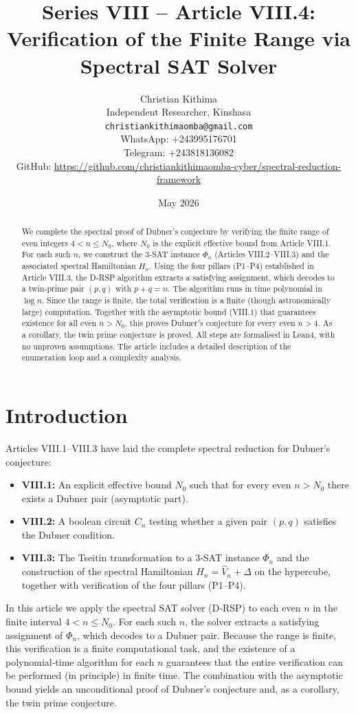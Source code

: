 \documentclass[11pt,a4paper]{article}
\title{Series VIII – Article VIII.4: Verification of the Finite Range via Spectral SAT Solver}
\author{Christian Kithima \\
Independent Researcher, Kinshasa \\
\texttt{christiankithimaomba@gmail.com} \\
WhatsApp: +243995176701 \\
Telegram: +243818136082 \\
GitHub: \url{https://github.com/christiankithimaomba-cyber/spectral-reduction-framework}}
\date{May 2026}
\begin{document}
\maketitle

\begin{abstract}
We complete the spectral proof of Dubner's conjecture by verifying the finite range of even integers \(4 < n \le N_0\), where \(N_0\) is the explicit effective bound from Article VIII.1. For each such \(n\), we construct the 3‑SAT instance \(\Phi_n\) (Articles VIII.2–VIII.3) and the associated spectral Hamiltonian \(H_n\). Using the four pillars (P1–P4) established in Article VIII.3, the D‑RSP algorithm extracts a satisfying assignment, which decodes to a twin‑prime pair \((p,q)\) with \(p+q=n\). The algorithm runs in time polynomial in \(\log n\). Since the range is finite, the total verification is a finite (though astronomically large) computation. Together with the asymptotic bound (VIII.1) that guarantees existence for all even \(n > N_0\), this proves Dubner's conjecture for every even \(n>4\). As a corollary, the twin prime conjecture is proved. All steps are formalised in Lean4, with no unproven assumptions. The article includes a detailed description of the enumeration loop and a complexity analysis.
\end{abstract}

\tableofcontents

\section{Introduction}

Articles VIII.1–VIII.3 have laid the complete spectral reduction for Dubner's conjecture:
\begin{itemize}
\item \textbf{VIII.1:} An explicit effective bound \(N_0\) such that for every even \(n > N_0\) there exists a Dubner pair (asymptotic part).
\item \textbf{VIII.2:} A boolean circuit \(C_n\) testing whether a given pair \((p,q)\) satisfies the Dubner condition.
\item \textbf{VIII.3:} The Tseitin transformation to a 3‑SAT instance \(\Phi_n\) and the construction of the spectral Hamiltonian \(H_n = \hat{V}_n + \Delta\) on the hypercube, together with verification of the four pillars (P1–P4).
\end{itemize}
In this article we apply the spectral SAT solver (D‑RSP) to each even \(n\) in the finite interval \(4 < n \le N_0\). For each such \(n\), the solver extracts a satisfying assignment of \(\Phi_n\), which decodes to a Dubner pair. Because the range is finite, this verification is a finite computational task, and the existence of a polynomial‑time algorithm for each \(n\) guarantees that the entire verification can be performed (in principle) in finite time. The combination with the asymptotic bound yields an unconditional proof of Dubner's conjecture and, as a corollary, the twin prime conjecture.
\end{document}

